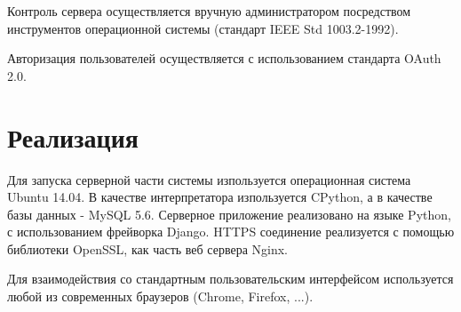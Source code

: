 \documentclass[10pt]{article}
\begin{document}
Контроль сервера осуществляется вручную администратором посредством инструментов операционной системы (стандарт IEEE Std 1003.2-1992).

Авторизация пользователей осуществляется с использованием стандарта OAuth 2.0.

\section{Реализация}

Для запуска серверной части системы изпользуется операционная система Ubuntu 14.04.
В качестве интерпретатора изпользуется CPython, а в качестве базы данных - MySQL 5.6.
Серверное приложение реализовано на языке Python, с использованием фрейворка Django.
HTTPS соединение реализуется с помощью библиотеки OpenSSL, как часть веб сервера Nginx.

Для взаимодействия со стандартным пользовательским интерфейсом используется любой из современных браузеров (Chrome, Firefox, ...).
\end{document}
